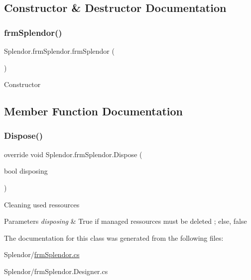 \subsection{Constructor \& Destructor Documentation}
\mbox{\label{class_splendor_1_1frm_splendor_ad9c938893d23192acb1996053e3ea87b}} 
\subsubsection{\texorpdfstring{frm\+Splendor()}{frmSplendor()}}
{\footnotesize\ttfamily Splendor.\+frm\+Splendor.\+frm\+Splendor (\begin{DoxyParamCaption}{ }\end{DoxyParamCaption})}



Constructor 



\subsection{Member Function Documentation}
\mbox{\label{class_splendor_1_1frm_splendor_a749f4f1d67c78e74aa1a55aa6fdd754b}} 
\subsubsection{\texorpdfstring{Dispose()}{Dispose()}}
{\footnotesize\ttfamily override void Splendor.\+frm\+Splendor.\+Dispose (\begin{DoxyParamCaption}\item[{bool}]{disposing }\end{DoxyParamCaption})\hspace{0.3cm}{\ttfamily [protected]}}



Cleaning used ressources 


\begin{DoxyParams}{Parameters}
{\em disposing} & True if managed ressources must be deleted ; else, false\\
\hline
\end{DoxyParams}


The documentation for this class was generated from the following files\+:\begin{DoxyCompactItemize}
\item 
Splendor/\hyperlink{frm_splendor_8cs}{frm\+Splendor.\+cs}\item 
Splendor/frm\+Splendor.\+Designer.\+cs\end{DoxyCompactItemize}
